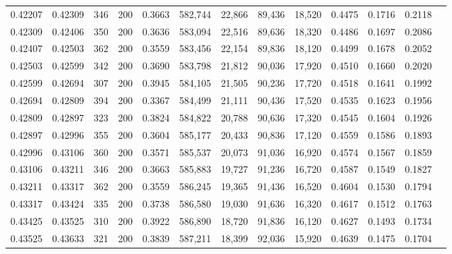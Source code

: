 \begin{tabular}{rrrrrrrrrrrrr}
0.42207 & 0.42309 &   346 & 200 &                                     0.3663 & 582,744 &  22,866 &  89,436 &  18,520 & 0.4475 & 0.1716 & 0.2118 \\
0.42309 & 0.42406 &   350 & 200 &                                     0.3636 & 583,094 &  22,516 &  89,636 &  18,320 & 0.4486 & 0.1697 & 0.2086 \\
0.42407 & 0.42503 &   362 & 200 &                                     0.3559 & 583,456 &  22,154 &  89,836 &  18,120 & 0.4499 & 0.1678 & 0.2052 \\
0.42503 & 0.42599 &   342 & 200 &                                     0.3690 & 583,798 &  21,812 &  90,036 &  17,920 & 0.4510 & 0.1660 & 0.2020 \\
0.42599 & 0.42694 &   307 & 200 &                                     0.3945 & 584,105 &  21,505 &  90,236 &  17,720 & 0.4518 & 0.1641 & 0.1992 \\
0.42694 & 0.42809 &   394 & 200 &                                     0.3367 & 584,499 &  21,111 &  90,436 &  17,520 & 0.4535 & 0.1623 & 0.1956 \\
0.42809 & 0.42897 &   323 & 200 &                                     0.3824 & 584,822 &  20,788 &  90,636 &  17,320 & 0.4545 & 0.1604 & 0.1926 \\
0.42897 & 0.42996 &   355 & 200 &                                     0.3604 & 585,177 &  20,433 &  90,836 &  17,120 & 0.4559 & 0.1586 & 0.1893 \\
0.42996 & 0.43106 &   360 & 200 &                                     0.3571 & 585,537 &  20,073 &  91,036 &  16,920 & 0.4574 & 0.1567 & 0.1859 \\
0.43106 & 0.43211 &   346 & 200 &                                     0.3663 & 585,883 &  19,727 &  91,236 &  16,720 & 0.4587 & 0.1549 & 0.1827 \\
0.43211 & 0.43317 &   362 & 200 &                                     0.3559 & 586,245 &  19,365 &  91,436 &  16,520 & 0.4604 & 0.1530 & 0.1794 \\
0.43317 & 0.43424 &   335 & 200 &                                     0.3738 & 586,580 &  19,030 &  91,636 &  16,320 & 0.4617 & 0.1512 & 0.1763 \\
0.43425 & 0.43525 &   310 & 200 &                                     0.3922 & 586,890 &  18,720 &  91,836 &  16,120 & 0.4627 & 0.1493 & 0.1734 \\
0.43525 & 0.43633 &   321 & 200 &                                     0.3839 & 587,211 &  18,399 &  92,036 &  15,920 & 0.4639 & 0.1475 & 0.1704 \\

\end{tabular}
